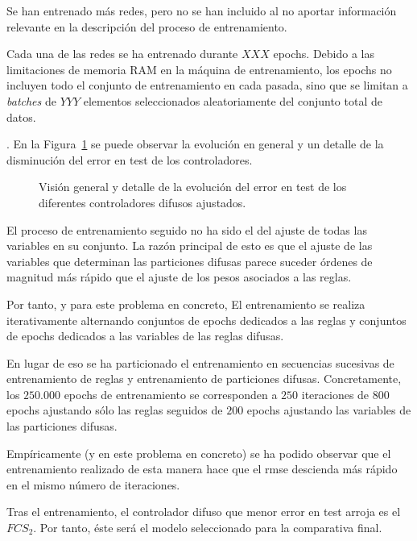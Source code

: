 Se han entrenado más redes, pero no se han incluido al no aportar información relevante en la descripción del proceso de entrenamiento.

Cada una de las redes se ha entrenado durante $XXX$ epochs. Debido a las limitaciones de memoria RAM en la máquina de entrenamiento, los epochs no incluyen todo el conjunto de entrenamiento en cada pasada, sino que se limitan a \textit{batches} de $YYY$ elementos seleccionados aleatoriamente del conjunto total de datos.

. En la Figura~\ref{fig:adjusted-fcs} se puede observar la evolución en general y un detalle de la disminución del error en test de los controladores.

\begin{figure}
	\centering
	\qquad
	\caption[Evolución del error en test de los controladores difusos ajustados]{Visión general y detalle de la evolución del error en test de los diferentes controladores difusos ajustados.}
	\label{fig:adjusted-fcs}
\end{figure}

El proceso de entrenamiento seguido no ha sido el del ajuste de todas las variables en su conjunto. La razón principal de esto es que el ajuste de las variables que determinan las particiones difusas parece suceder órdenes de magnitud más rápido que el ajuste de los pesos asociados a las reglas.

Por tanto, y para este problema en concreto, El entrenamiento se realiza iterativamente alternando conjuntos de epochs dedicados a las reglas y conjuntos de epochs dedicados a las variables de las reglas difusas.

En lugar de eso se ha particionado el entrenamiento en secuencias sucesivas de entrenamiento de reglas y entrenamiento de particiones difusas. Concretamente, los $250.000$ epochs de entrenamiento se corresponden a $250$ iteraciones de $800$ epochs ajustando sólo las reglas seguidos de $200$ epochs ajustando las variables de las particiones difusas.

Empíricamente (y en este problema en concreto) se ha podido observar que el entrenamiento realizado de esta manera hace que el \ac{rmse} descienda más rápido en el mismo número de iteraciones.

Tras el entrenamiento, el controlador difuso que menor error en test arroja es el $FCS_2$. Por tanto, éste será el modelo seleccionado para la comparativa final.


